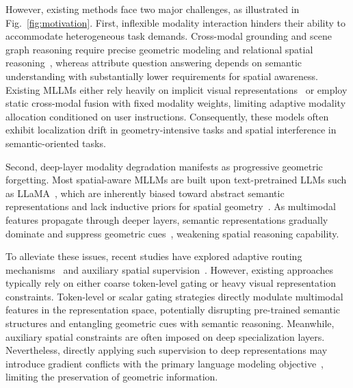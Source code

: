\documentclass[lettersize,journal]{IEEEtran}
\begin{document}
However, existing methods face two major challenges, as illustrated in Fig.~\ref{fig:motivation}. First, inflexible modality interaction hinders their ability to accommodate heterogeneous task demands. {Cross-modal} grounding and scene graph reasoning require precise geometric modeling and relational spatial reasoning~\cite{languagerefer2021,ViL3DRel2022,feng2025hierarchical}, whereas attribute question answering depends on semantic understanding with substantially lower requirements for spatial awareness. Existing MLLMs either rely heavily on implicit visual representations~\cite{chatscene2024} or employ static cross-modal fusion with fixed modality weights, limiting adaptive modality allocation conditioned on user instructions. Consequently, these models often exhibit localization drift in geometry-intensive tasks and spatial interference in semantic-oriented tasks.

Second, deep-layer modality degradation {manifests} as progressive geometric forgetting. Most spatial-aware MLLMs are built upon text-pretrained LLMs such as LLaMA~\cite{llama2023}, which are inherently biased toward abstract semantic representations and lack inductive priors for spatial geometry~\cite{how3d2025}. As multimodal features propagate through deeper layers, semantic representations gradually dominate and suppress geometric cues~\cite{spatial-mllm2025}, weakening spatial reasoning capability.

To alleviate these issues, recent studies have explored adaptive routing mechanisms~\cite{wang2026dynam3d} and auxiliary spatial supervision~\cite{huang2026mllm}. However, existing approaches typically rely on either coarse token-level gating or heavy visual representation constraints. Token-level or scalar gating strategies directly modulate multimodal features in the representation space, potentially disrupting pre-trained semantic structures and entangling geometric cues with semantic reasoning. Meanwhile, auxiliary spatial constraints are often imposed on deep specialization layers. Nevertheless, directly applying such supervision to deep representations may introduce gradient conflicts with the primary language modeling objective~\cite{gradientsurgery2020,conflictgradient2021}, limiting the preservation of geometric information.

\end{document}
